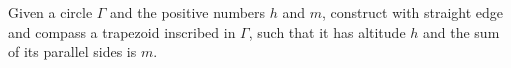 Given a circle $\Gamma$ and the positive numbers $h$ and $m$,   construct with straight edge and compass a trapezoid inscribed in $\Gamma$,  such that it has altitude  $h$ and the sum of its parallel sides is $m$.